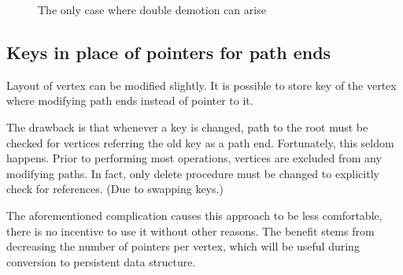 \begin{figure}
\begin{center}
\qquad
{}
\qquad
{}
\qquad
{}
\end{center}
\caption{The only case where double demotion can arise}
\end{figure}

\subsection{Keys in place of pointers for path ends}

Layout of vertex can be modified slightly. It is possible to store key of the vertex where modifying path ends instead of pointer to it.

The drawback is that whenever a key is changed, path to the root must be checked for vertices referring the old key as a path end. Fortunately, this seldom happens. Prior to performing most operations, vertices are excluded from any modifying paths. In fact, only delete procedure must be changed to explicitly check for references. (Due to swapping keys.)

The aforementioned complication causes this approach to be less comfortable, there is no incentive to use it without other reasons. The benefit stems from decreasing the number of pointers per vertex, which will be useful during conversion to persistent data structure.